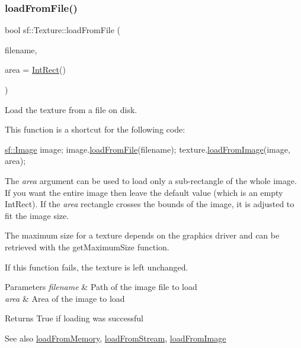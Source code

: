 \subsubsection{\texorpdfstring{load\+From\+File()}{loadFromFile()}}
{\footnotesize\ttfamily bool sf\+::\+Texture\+::load\+From\+File (\begin{DoxyParamCaption}\item[{const std\+::string \&}]{filename,  }\item[{const \hyperlink{classsf_1_1_rect}{Int\+Rect} \&}]{area = {\ttfamily \hyperlink{classsf_1_1_rect}{Int\+Rect}()} }\end{DoxyParamCaption})}



Load the texture from a file on disk. 

This function is a shortcut for the following code\+: 
\begin{DoxyCode}
\hyperlink{classsf_1_1_image}{sf::Image} image;
image.\hyperlink{classsf_1_1_image_a9e4f2aa8e36d0cabde5ed5a4ef80290b}{loadFromFile}(filename);
texture.\hyperlink{classsf_1_1_texture_abec4567ad9856a3596dc74803f26fba2}{loadFromImage}(image, area);
\end{DoxyCode}


The {\itshape area} argument can be used to load only a sub-\/rectangle of the whole image. If you want the entire image then leave the default value (which is an empty Int\+Rect). If the {\itshape area} rectangle crosses the bounds of the image, it is adjusted to fit the image size.

The maximum size for a texture depends on the graphics driver and can be retrieved with the get\+Maximum\+Size function.

If this function fails, the texture is left unchanged.


\begin{DoxyParams}{Parameters}
{\em filename} & Path of the image file to load \\
\hline
{\em area} & Area of the image to load\\
\hline
\end{DoxyParams}
\begin{DoxyReturn}{Returns}
True if loading was successful
\end{DoxyReturn}
\begin{DoxySeeAlso}{See also}
\hyperlink{classsf_1_1_texture_a2c4adb19dd4cbee0a588eeb85e52a249}{load\+From\+Memory}, \hyperlink{classsf_1_1_texture_a786b486a46b1c6d1c16ff4af61ecc601}{load\+From\+Stream}, \hyperlink{classsf_1_1_texture_abec4567ad9856a3596dc74803f26fba2}{load\+From\+Image} 
\end{DoxySeeAlso}
\mbox{\label{classsf_1_1_texture_abec4567ad9856a3596dc74803f26fba2}} 
